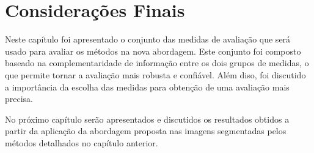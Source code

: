 \section{Considera\c{c}\~{o}es Finais}

Neste cap\'{i}tulo foi apresentado o conjunto das medidas de avalia\c{c}\~{a}o que ser\'{a} usado para avaliar os m\'{e}todos na nova abordagem. Este conjunto foi composto baseado na complementaridade de informa\c{c}\~{a}o entre os dois grupos de medidas, o que permite tornar a avalia\c{c}\~{a}o mais robusta e confi\'{a}vel. Al\'{e}m diso, foi discutido a import\^{a}ncia da escolha das medidas para obten\c{c}\~{a}o de uma avalia\c{c}\~{a}o mais precisa.

No pr\'{o}ximo cap\'{i}tulo ser\~{a}o apresentados e discutidos os resultados obtidos a partir da aplica\c{c}\~{a}o da abordagem proposta nas imagens segmentadas pelos m\'{e}todos detalhados no cap\'{i}tulo anterior.